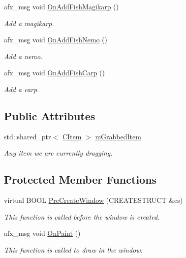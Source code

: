 \begin{DoxyCompactItemize}
afx\+\_\+msg void \hyperlink{class_c_child_view_ae57ff94ee7cff8741c8d5a88c7fbba65}{On\+Add\+Fish\+Magikarp} ()
\begin{DoxyCompactList}\small\item\em Add a magikarp. \end{DoxyCompactList}\item 
afx\+\_\+msg void \hyperlink{class_c_child_view_a425e5b13c9f4bbb54628fc15e5f9cf24}{On\+Add\+Fish\+Nemo} ()
\begin{DoxyCompactList}\small\item\em Add a nemo. \end{DoxyCompactList}\item 
afx\+\_\+msg void \hyperlink{class_c_child_view_a767a63adaaaebeb086861a27fdf36c8c}{On\+Add\+Fish\+Carp} ()
\begin{DoxyCompactList}\small\item\em Add a carp. \end{DoxyCompactList}\end{DoxyCompactItemize}
\subsection*{Public Attributes}
\begin{DoxyCompactItemize}
\item 
\mbox{\label{class_c_child_view_a5666495f6927ddc0636738dc02db8c3f}} 
std\+::shared\+\_\+ptr$<$ \hyperlink{class_c_item}{C\+Item} $>$ \hyperlink{class_c_child_view_a5666495f6927ddc0636738dc02db8c3f}{m\+Grabbed\+Item}
\begin{DoxyCompactList}\small\item\em Any item we are currently dragging. \end{DoxyCompactList}\end{DoxyCompactItemize}
\subsection*{Protected Member Functions}
\begin{DoxyCompactItemize}
\item 
\mbox{\label{class_c_child_view_a072cbcba60255377ac9d82aed9a14ce8}} 
virtual B\+O\+OL \hyperlink{class_c_child_view_a072cbcba60255377ac9d82aed9a14ce8}{Pre\+Create\+Window} (C\+R\+E\+A\+T\+E\+S\+T\+R\+U\+CT \&cs)
\begin{DoxyCompactList}\small\item\em This function is called before the window is created. \end{DoxyCompactList}\item 
afx\+\_\+msg void \hyperlink{class_c_child_view_a8ea6d42631a4f9f446923ff864b239ab}{On\+Paint} ()
\begin{DoxyCompactList}\small\item\em This function is called to draw in the window. \end{DoxyCompactList}\end{DoxyCompactItemize}


